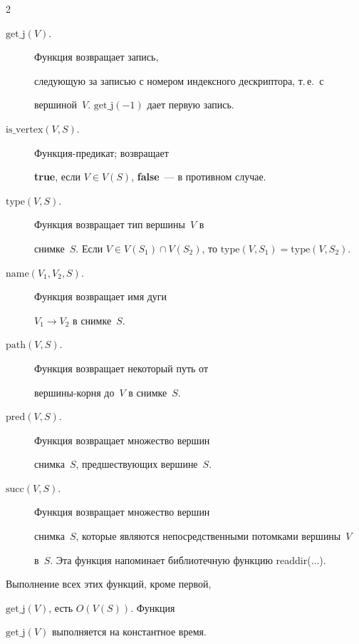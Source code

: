 \begin{multicols}{2}
\noindent


\begin{description}


\item[$\mathrm{get}\_\mathrm{j}(V)$.] Функция возвращает запись, 


сле\-ду\-ющую за записью с номером индексного дескриптора, т.\,е.\ с 


вершиной~$V$. $\mathrm{get}\_\mathrm{j}(-1)$ дает первую запись.


\item[$\mathrm{is}\_\mathrm{vertex}(V, S)$.] Функция-предикат; возвращает 


\textbf{true}, если $V\in V(S)$, \textbf{false}~--- в противном случае.


\item[$\mathrm{type}(V, S)$.] Функция возвращает тип вершины~$V$ в 


снимке~$S$. Если $V\in  V(S_1) \cap V(S_2)$, то $\mathrm{type}(V, S_1) = 


\mathrm{type}(V, S_2)$.


\item[$\mathrm{name}(V_1, V_2, S)$.] Функция возвращает имя дуги 


$V_1\rightarrow V_2$ в снимке~$S$.


\item[$\mathrm{path}(V, S)$.] Функция возвращает некоторый путь от 


вершины-корня до~$V$ в снимке~$S$.


\item[$\mathrm{pred}(V, S)$.] Функция возвращает множество вершин 


снимка~$S$, предшествующих вершине~$S$.


\item[$\mathrm{succ}(V, S)$.] Функция возвращает множество вершин 


снимка~$S$, которые являются непосредственными потомками вершины~$V$ 


в~$S$. Эта функция напоминает библиотечную функцию readdir($\ldots$).


\end{description}


      


      Выполнение всех этих функций, кроме первой, 


$\mathrm{get}\_\mathrm{j}(V)$, есть $O(V(S))$. Функция 


$\mathrm{get}\_\mathrm{j}(V)$ выполняется на константное время.



\end{multicols}
